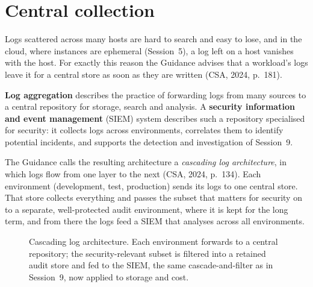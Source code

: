 \section{Central collection}

Logs scattered across many hosts are hard to search and easy to lose, and
in the cloud, where instances are ephemeral (Session~5), a log left on a
host vanishes with the host. For exactly this reason the Guidance advises
that a workload's logs leave it for a central store as soon as they are
written (CSA, 2024, p.~181).

\begin{definition}\label{def:logagg}
\textbf{Log aggregation} describes the practice of forwarding logs from many
sources to a central repository for storage, search and analysis. A
\textbf{security information and event management} (SIEM) system describes
such a repository specialised for security: it collects logs across
environments, correlates them to identify potential incidents, and supports
the detection and investigation of Session~9.
\end{definition}

The Guidance calls the resulting architecture a \emph{cascading log
architecture}, in which logs flow from one layer to the next (CSA, 2024,
p.~134). Each environment (development, test, production) sends its logs to
one central store. That store collects everything and passes the subset that
matters for security on to a separate, well-protected audit environment,
where it is kept for the long term, and from there the logs feed a SIEM that
analyses across all environments.

\begin{figure}[htbp]
\centering
{}
\caption{Cascading log architecture. Each environment forwards to a central
repository; the security-relevant subset is filtered into a retained audit
store and fed to the SIEM, the same cascade-and-filter as in Session~9, now
applied to storage and cost.}
\label{fig:cascade}
\end{figure}

